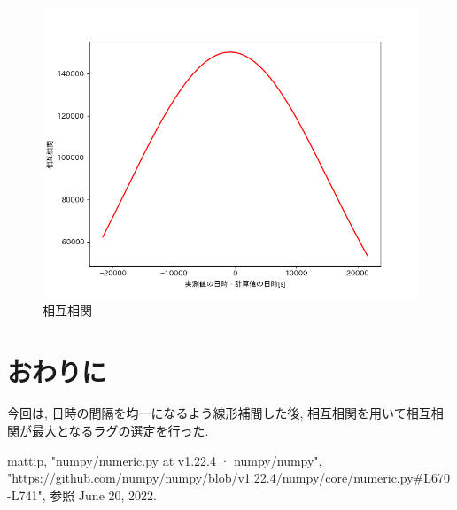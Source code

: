 \documentclass[a4j,12pt,]{jarticle}
\begin{document}
\begin{figure}[H]
  \begin{center}
    \includegraphics[width=160mm]{correlogram.png}
    \caption{相互相関}
    \label{p1}
  \end{center}
\end{figure}

\section{おわりに}
今回は, 日時の間隔を均一になるよう線形補間した後, 相互相関を用いて相互相関が最大となるラグの選定を行った.

\begin{thebibliography}{5}
  mattip, "numpy/numeric.py at v1.22.4 · numpy/numpy",\\ "https://github.com/numpy/numpy/blob/v1.22.4/numpy/core/numeric.py\#L670-L741", 参照 June 20, 2022.
\end{thebibliography}
\end{document}
